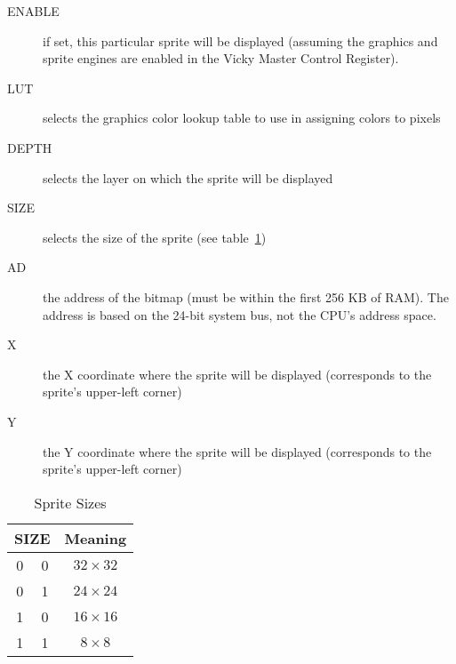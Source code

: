 \begin{description}
    \item[ENABLE] if set, this particular sprite will be displayed (assuming the graphics and sprite engines are enabled in the Vicky Master Control Register).

    \item[LUT] selects the graphics color lookup table to use in assigning colors to pixels

    \item[DEPTH] selects the layer on which the sprite will be displayed

    \item[SIZE] selects the size of the sprite (see table~\ref{tab:sp_sizes})

    \item[AD] the address of the bitmap (must be within the first 256 KB of RAM). The address is based on the 24-bit system bus, not the CPU's address space.

    \item[X] the X coordinate where the sprite will be displayed (corresponds to the sprite's upper-left corner)

    \item[Y] the Y coordinate where the sprite will be displayed (corresponds to the sprite's upper-left corner)
\end{description}

\begin{table}[h]
    \begin{center}
        \begin{tabular}{|c|c|c|} \hline
            \multicolumn{2}{|c|}{SIZE} & Meaning \\ \hline\hline
            0 & 0 & $32 \times 32$ \\ \hline
            0 & 1 & $24 \times 24$ \\ \hline
            1 & 0 & $16 \times 16$ \\ \hline
            1 & 1 & $8 \times 8$ \\ \hline
        \end{tabular}
    \end{center}
    \caption{Sprite Sizes}
    \label{tab:sp_sizes}
\end{table}
